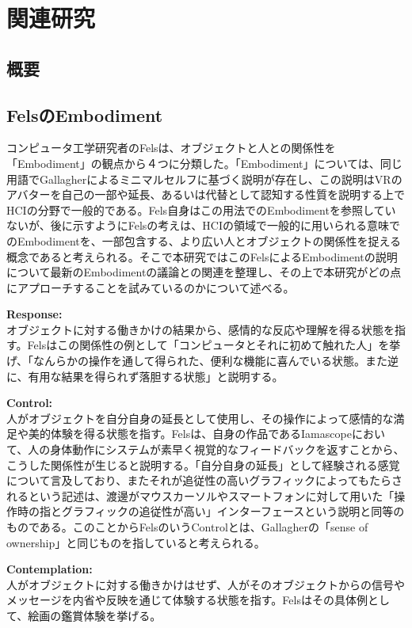 \chapter{関連研究}
\label{related_works}
\section{概要}

\section{FelsのEmbodiment}
コンピュータ工学研究者のFelsは、オブジェクトと人との関係性を「Embodiment」の観点から４つに分類した\cite{Fels}。「Embodiment」については、同じ用語でGallagher\cite{Gallagher2000}によるミニマルセルフに基づく説明が存在し、この説明はVRのアバターを自己の一部や延長、あるいは代替として認知する性質を説明する上でHCIの分野で一般的である。Fels自身はこの用法でのEmbodimentを参照していないが、後に示すようにFelsの考えは、HCIの領域で一般的に用いられる意味でのEmbodimentを、一部包含する、より広い人とオブジェクトの関係性を捉える概念であると考えられる。そこで本研究ではこのFelsによるEmbodimentの説明について最新のEmbodimentの議論との関連を整理し、その上で本研究がどの点にアプローチすることを試みているのかについて述べる。

\textbf{Response:}\\
オブジェクトに対する働きかけの結果から、感情的な反応や理解を得る状態を指す。Felsはこの関係性の例として「コンピュータとそれに初めて触れた人」を挙げ、「なんらかの操作を通して得られた、便利な機能に喜んでいる状態。また逆に、有用な結果を得られず落胆する状態」と説明する。

\textbf{Control:}\\
人がオブジェクトを自分自身の延長として使用し、その操作によって感情的な満足や美的体験を得る状態を指す。Felsは、自身の作品であるIamascopeにおいて、人の身体動作にシステムが素早く視覚的なフィードバックを返すことから、こうした関係性が生じると説明する。「自分自身の延長」として経験される感覚について言及しており、またそれが追従性の高いグラフィックによってもたらされるという記述は、渡邊がマウスカーソルやスマートフォンに対して用いた「操作時の指とグラフィックの追従性が高い」インターフェースという説明と同等のものである。このことからFelsのいうControlとは、Gallagherの「sense of ownership」と同じものを指していると考えられる。

\textbf{Contemplation:}\\
人がオブジェクトに対する働きかけはせず、人がそのオブジェクトからの信号やメッセージを内省や反映を通じて体験する状態を指す。Felsはその具体例として、絵画の鑑賞体験を挙げる。


